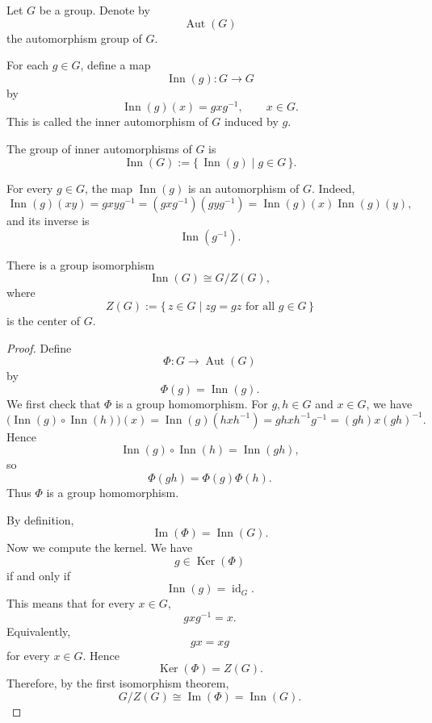 Let \(G\) be a group. Denote by
\[
    \operatorname{Aut}(G)
\]
the automorphism group of \(G\).

For each \(g\in G\), define a map
\[
    \operatorname{Inn}(g):G\longrightarrow G
\]
by
\[
    \operatorname{Inn}(g)(x)=gxg^{-1},
    \qquad x\in G.
\]
This is called the inner automorphism of \(G\) induced by \(g\).

\begin{definition}
    The group of inner automorphisms of \(G\) is
    \[
        \operatorname{Inn}(G)
        :=
        \{\,\operatorname{Inn}(g)\mid g\in G\,\}.
    \]
\end{definition}

\begin{remark}
    For every \(g\in G\), the map \(\operatorname{Inn}(g)\) is an automorphism of
    \(G\). Indeed,
    \[
        \operatorname{Inn}(g)(xy)
        =
        gxyg^{-1}
        =
        (gxg^{-1})(gyg^{-1})
        =
        \operatorname{Inn}(g)(x)\operatorname{Inn}(g)(y),
    \]
    and its inverse is
    \[
        \operatorname{Inn}(g^{-1}).
    \]
\end{remark}

\begin{proposition}
    There is a group isomorphism
    \[
        \operatorname{Inn}(G)\cong G/Z(G),
    \]
    where
    \[
        Z(G):=\{\,z\in G\mid zg=gz \text{ for all } g\in G\,\}
    \]
    is the center of \(G\).
\end{proposition}

\begin{proof}
    Define
    \[
        \Phi:G\longrightarrow \operatorname{Aut}(G)
    \]
    by
    \[
        \Phi(g)=\operatorname{Inn}(g).
    \]
    We first check that \(\Phi\) is a group homomorphism. For \(g,h\in G\) and
    \(x\in G\), we have
    \[
        \bigl(\operatorname{Inn}(g)\circ \operatorname{Inn}(h)\bigr)(x)
        =
        \operatorname{Inn}(g)(hxh^{-1})
        =
        ghxh^{-1}g^{-1}
        =
        (gh)x(gh)^{-1}.
    \]
    Hence
    \[
        \operatorname{Inn}(g)\circ \operatorname{Inn}(h)
        =
        \operatorname{Inn}(gh),
    \]
    so
    \[
        \Phi(gh)=\Phi(g)\Phi(h).
    \]
    Thus \(\Phi\) is a group homomorphism.

    By definition,
    \[
        \operatorname{Im}(\Phi)=\operatorname{Inn}(G).
    \]
    Now we compute the kernel. We have
    \[
        g\in \operatorname{Ker}(\Phi)
    \]
    if and only if
    \[
        \operatorname{Inn}(g)=\operatorname{id}_G.
    \]
    This means that for every \(x\in G\),
    \[
        gxg^{-1}=x.
    \]
    Equivalently,
    \[
        gx=xg
    \]
    for every \(x\in G\). Hence
    \[
        \operatorname{Ker}(\Phi)=Z(G).
    \]
    Therefore, by the first isomorphism theorem,
    \[
        G/Z(G)\cong \operatorname{Im}(\Phi)=\operatorname{Inn}(G).
    \]
\end{proof}

